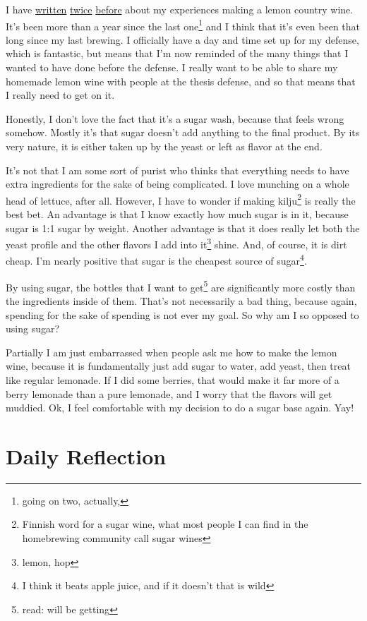 \documentclass[12pt]{article}
\renewcommand{\,}{\textsuperscript{,}}
\begin{document}
I have \href{lemon-wine}{written} \href{lemon-wine-2}{twice} \href{lemon-wine-3}{before} about my experiences making a lemon country wine.  
It's been more than a year since the last one\footnote{going on two, actually,} and I think that it's even been that long since my last brewing.  
I officially have a day and time set up for my defense, which is fantastic, but means that I'm now reminded of the many things that I wanted to have done before the defense.  
I really want to be able to share my homemade lemon wine with people at the thesis defense, and so that means that I really need to get on it.

Honestly, I don't love the fact that it's a sugar wash, because that feels wrong somehow.  
Mostly it's that sugar doesn't add anything to the final product.  
By its very nature, it is either taken up by the yeast or left as flavor at the end.

It's not that I am some sort of purist who thinks that everything needs to have extra ingredients for the sake of being complicated.  
I love munching on a whole head of lettuce, after all.  
However, I have to wonder if making kilju\footnote{Finnish word for a sugar wine, what most people I can find in the homebrewing community call sugar wines} is really the best bet.  
An advantage is that I know exactly how much sugar is in it, because sugar is 1:1 sugar by weight.  
Another advantage is that it does really let both the yeast profile and the other flavors I add into it\footnote{lemon, hop} shine.  
And, of course, it is dirt cheap.  
I'm nearly positive that sugar is the cheapest source of sugar\footnote{I think it beats apple juice, and if it doesn't that is wild}.

By using sugar, the bottles that I want to get\footnote{read: will be getting} are significantly more costly than the ingredients inside of them.  
That's not necessarily a bad thing, because again, spending for the sake of spending is not ever my goal.  
So why am I so opposed to using sugar?

Partially I am just embarrassed when people ask me how to make the lemon wine, because it is fundamentally just add sugar to water, add yeast, then treat like regular lemonade.  
If I did some berries, that would make it far more of a berry lemonade than a pure lemonade, and I worry that the flavors will get muddied.  
Ok, I feel comfortable with my decision to do a sugar base again.  
Yay!

\section{Daily Reflection}
\end{document}
